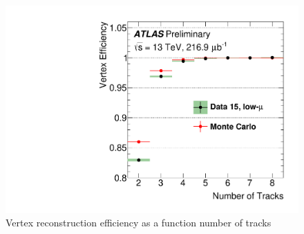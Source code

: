 \begin{figure}[htpb!]
\begin{center}
  \includegraphics[width=0.55\linewidth]{figures/Reco/TrackingVertex}
\caption{Vertex reconstruction efficiency as a function number of tracks\cite{ATL-PHYS-PUB-2015-026}}
\label{fig:reco-primaryvertexeff}
\end{center}
\end{figure}


